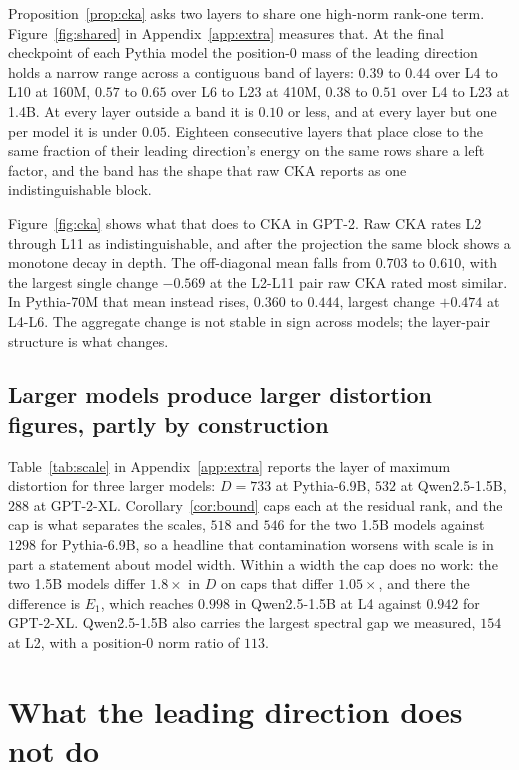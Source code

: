 \documentclass{article}
\theoremstyle{spaced}
\theoremstyle{definition}
\begin{document}
Proposition~\ref{prop:cka} asks two layers to share one high-norm rank-one term. Figure~\ref{fig:shared} in Appendix~\ref{app:extra} measures that. At the final checkpoint of each Pythia model the position-0 mass of the leading direction holds a narrow range across a contiguous band of layers: $0.39$ to $0.44$ over L4 to L10 at 160M, $0.57$ to $0.65$ over L6 to L23 at 410M, $0.38$ to $0.51$ over L4 to L23 at 1.4B. At every layer outside a band it is $0.10$ or less, and at every layer but one per model it is under $0.05$. Eighteen consecutive layers that place close to the same fraction of their leading direction's energy on the same rows share a left factor, and the band has the shape that raw CKA reports as one indistinguishable block.

Figure~\ref{fig:cka} shows what that does to CKA in GPT-2. Raw CKA rates L2 through L11 as indistinguishable, and after the projection the same block shows a monotone decay in depth. The off-diagonal mean falls from $0.703$ to $0.610$, with the largest single change $-0.569$ at the L2-L11 pair raw CKA rated most similar. In Pythia-70M that mean instead rises, $0.360$ to $0.444$, largest change $+0.474$ at L4-L6. The aggregate change is not stable in sign across models; the layer-pair structure is what changes.

\subsection{Larger models produce larger distortion figures, partly by construction}

Table~\ref{tab:scale} in Appendix~\ref{app:extra} reports the layer of maximum distortion for three larger models: $D = 733$ at Pythia-6.9B, $532$ at Qwen2.5-1.5B, $288$ at GPT-2-XL. Corollary~\ref{cor:bound} caps each at the residual rank, and the cap is what separates the scales, $518$ and $546$ for the two 1.5B models against $1298$ for Pythia-6.9B, so a headline that contamination worsens with scale is in part a statement about model width. Within a width the cap does no work: the two 1.5B models differ $1.8\times$ in $D$ on caps that differ $1.05\times$, and there the difference is $E_1$, which reaches $0.998$ in Qwen2.5-1.5B at L4 against $0.942$ for GPT-2-XL. Qwen2.5-1.5B also carries the largest spectral gap we measured, $154$ at L2, with a position-0 norm ratio of $113$.

\section{What the leading direction does not do}
\label{sec:not}
\end{document}
